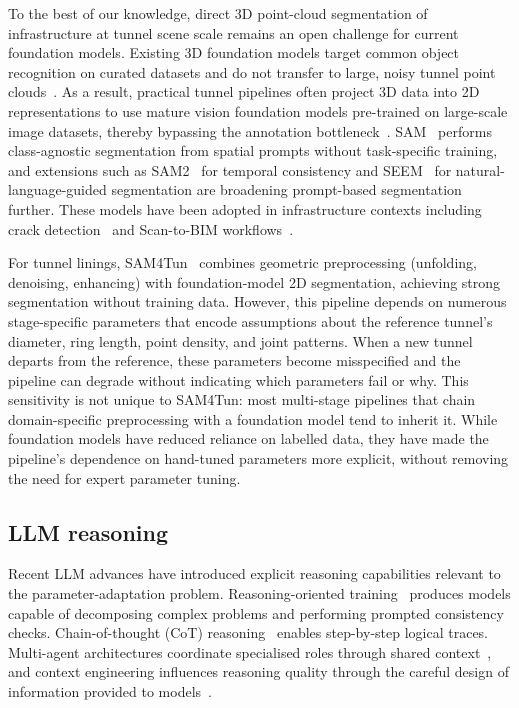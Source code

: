 \documentclass[a4paper,fleqn]{cas-dc}
\begin{document}
{To the best of our knowledge, direct 3D point-cloud segmentation of infrastructure at tunnel scene scale remains an open challenge for current foundation models. Existing 3D foundation models target common object recognition on curated datasets and do not transfer to large, noisy tunnel point clouds~\cite{camuffo2022recent, liu2023openshape, guo2023pointbind, xu2024pointllm}. As a result, practical tunnel pipelines often project 3D data into 2D representations to use mature vision foundation models pre-trained on large-scale image datasets, thereby bypassing the annotation bottleneck~\cite{caron2021dino, franceschelli2024training}. SAM~\cite{kirillov2023sam} performs class-agnostic segmentation from spatial prompts without task-specific training, and extensions such as SAM2~\cite{ravi2024sam2} for temporal consistency and SEEM~\cite{zou2023segment} for natural-language-guided segmentation are broadening prompt-based segmentation further. These models have been adopted in infrastructure contexts including crack detection~\cite{ge2024cracksam} and Scan-to-BIM workflows~\cite{wang2024omni, pan2024zero}.

For tunnel linings, SAM4Tun~\cite{ye2025sam4tun} combines geometric preprocessing (unfolding, denoising, enhancing) with foundation-model 2D segmentation, achieving strong segmentation without training data. However, this pipeline depends on numerous stage-specific parameters that encode assumptions about the reference tunnel's diameter, ring length, point density, and joint patterns. When a new tunnel departs from the reference, these parameters become misspecified and the pipeline can degrade without indicating which parameters fail or why. This sensitivity is not unique to SAM4Tun: most multi-stage pipelines that chain domain-specific preprocessing with a foundation model tend to inherit it. While foundation models have reduced reliance on labelled data, they have made the pipeline's dependence on hand-tuned parameters more explicit, without removing the need for expert parameter tuning.

\subsection{LLM reasoning}

Recent LLM advances have introduced explicit reasoning capabilities relevant to the parameter-adaptation problem. Reasoning-oriented training~\cite{ouyang2022training, deepseek2025analysis, chua2025deepseek, xiang2025metacot, openai2025o3, openai2025reasoningbestpractices} produces models capable of decomposing complex problems and performing prompted consistency checks. Chain-of-thought (CoT) reasoning~\cite{wei2023cot, kojima2023zeroshot} enables step-by-step logical traces. Multi-agent architectures coordinate specialised roles through shared context~\cite{hong2024metagpt, qian2024chatdev, chen2024comm, zhang2023igniting, zhang2024chain}, and context engineering influences reasoning quality through the careful design of information provided to models~\cite{xu2024retrieval, mei2025survey, anthropic2025context}.

}
\end{document}
